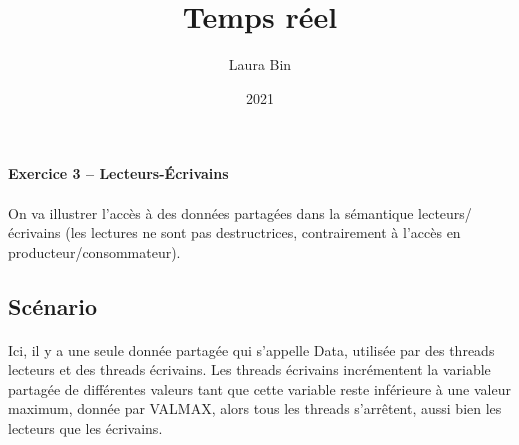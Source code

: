 \documentclass{article}
\title{Temps réel}
\date{2021}
\author{Laura Bin}
\begin{document}

    \begin{center}
        \textbf{\LARGE Exercice 3 -- Lecteurs-Écrivains}
    \end{center}

    \paragraph{}
    On va illustrer l'accès à des données partagées dans la sémantique lecteurs/écrivains (les lectures ne sont pas destructrices, contrairement à l'accès en producteur/consommateur).

    \subsection*{Scénario}

    \paragraph{}
    Ici, il y a une seule donnée partagée qui s'appelle Data, utilisée par des threads lecteurs et des threads écrivains. Les threads écrivains incrémentent la variable partagée de différentes valeurs tant que cette variable reste inférieure à une valeur maximum, donnée par VALMAX, alors tous les threads s'arrêtent, aussi bien les lecteurs que les écrivains.
\end{document}
